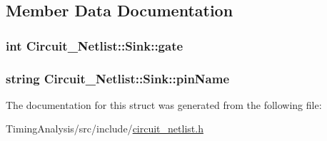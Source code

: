 \subsection{Member Data Documentation}
\hypertarget{structCircuit__Netlist_1_1Sink_a5728898bf1ef8a37b46f0f6274676889}{
\subsubsection[{gate}]{\setlength{\rightskip}{0pt plus 5cm}int Circuit\-\_\-\-Netlist\-::\-Sink\-::gate}}\label{structCircuit__Netlist_1_1Sink_a5728898bf1ef8a37b46f0f6274676889}
\hypertarget{structCircuit__Netlist_1_1Sink_ac2072a83f3d654b10f6ad0b2049cc2e6}{
\subsubsection[{pin\-Name}]{\setlength{\rightskip}{0pt plus 5cm}string Circuit\-\_\-\-Netlist\-::\-Sink\-::pin\-Name}}\label{structCircuit__Netlist_1_1Sink_ac2072a83f3d654b10f6ad0b2049cc2e6}


The documentation for this struct was generated from the following file\-:\begin{DoxyCompactItemize}
\item 
Timing\-Analysis/src/include/\hyperlink{circuit__netlist_8h}{circuit\-\_\-netlist.\-h}\end{DoxyCompactItemize}
